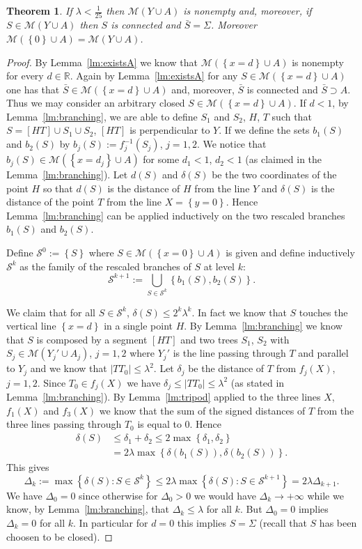 \documentclass{amsart}
\newcommand{\RR}{\mathbb R}
\newcommand{\abs}[1]{\left\vert #1 \right\vert}
\newcommand{\ENCLOSE}[1]{\left\{#1\right\}}
\newcommand{\M}{\mathcal{M}}
\renewcommand{\S}{\mathcal{S}}
\newtheorem{theorem}{Theorem}[section]
\theoremstyle{definition}
\theoremstyle{remark}
\begin{document}
\begin{theorem}\label{th:main}
If $\lambda < \frac 1{25}$ then $\M(Y\cup A)$ is nonempty 
and, moreover, if $S\in \M(Y\cup A)$
then $S$ is connected and $\bar S=\Sigma$.
Moreover $\M(\ENCLOSE{0}\cup A) = \M(Y\cup A)$.
\end{theorem}
%
\begin{proof}
By Lemma~\ref{lm:existsA} we know that $\M(\ENCLOSE{x=d}\cup A)$
is nonempty for every $d\in \RR$.
Again by Lemma~\ref{lm:existsA} for any $S\in \M(\ENCLOSE{x=d}\cup A)$ 
one has that $\bar S\in \M(\ENCLOSE{x=d}\cup A)$ and, moreover,
$\bar S$ is connected and $\bar S\supset A$.
Thus we may consider an arbitrary closed $S\in \M(\ENCLOSE{x=d}\cup A)$.
If $d<1$, 
by Lemma~\ref{lm:branching}, 
we are able to define $S_1$ and $S_2$, $H$, $T$
such that 
$S=[H T] \cup S_1 \cup S_2$, $[HT]$ is perpendicular to $Y$.
If we define the sets $b_1(S)$ and $b_2(S)$ 
by $b_j(S) := f_j^{-1}(S_j)$, $j=1,2$.
We notice that $b_j(S)\in \M(\ENCLOSE{x=d_j}\cup A)$ for some $d_1<1$, 
$d_2<1$ (as claimed in the Lemma~\ref{lm:branching}).
Let $d(S)$ and $\delta(S)$ be the two coordinates of the point $H$ 
so that $d(S)$ is the distance of $H$ from the line $Y$ 
and $\delta(S)$ is the distance of the point $T$ from the line $X=\ENCLOSE{y=0}$.
Hence Lemma~\ref{lm:branching} can be applied inductively on the two 
rescaled branches $b_1(S)$ and $b_2(S)$.

Define $\S^0:=\ENCLOSE{S}$ where $S\in \M(\ENCLOSE{x=0}\cup A)$ is given
and define inductively $\S^k$ as the family of the rescaled branches of $S$ 
at level $k$:
\[
  \S^{k+1} := \bigcup_{S\in \S^k}\ENCLOSE{b_1(S),b_2(S)}.
\]

We claim that for all $S\in \S^k$, $\delta(S)\le 2^k \lambda^k$.
In fact we know that $S$ touches the vertical line $\ENCLOSE{x=d}$ 
in a single point $H$.
By Lemma~\ref{lm:branching} we know that $S$ is composed 
by a segment $[H T]$ and two trees $S_1$, $S_2$
with $S_j\in \M(Y_j'\cup A_j)$, $j=1,2$
where $Y_j'$ is the line passing through $T$ and parallel to $Y_j$
and we know that $\abs{T T_0} \le \lambda^2$. 
Let $\delta_j$ be the distance of $T$ from $f_j(X)$, $j=1,2$.
Since $T_0\in f_j(X)$ we have $\delta_j\le \abs{T T_0} \le \lambda^2$
(as stated in Lemma~\ref{lm:branching}).
By Lemma~\ref{lm:tripod} applied to the three lines $X$, $f_1(X)$ and $f_3(X)$
we know that the sum of the signed distances of $T$ from the three lines 
passing through $T_0$ is equal to $0$.
Hence
\begin{align*}
  \delta(S) &\le \delta_1 + \delta_2 
    \le 2\max\ENCLOSE{\delta_1,\delta_2}\\
    &= 2\lambda\max\ENCLOSE{\delta(b_1(S)),\delta(b_2(S))}.
\end{align*}
This gives 
\[
  \Delta_k 
  := \max\ENCLOSE{\delta(S)\colon S\in \S^k}
   \le 2\lambda \max\ENCLOSE{\delta(S)\colon S\in \S^{k+1}}
   = 2 \lambda \Delta_{k+1}.
\]
We have $\Delta_0 = 0$ since otherwise for 
$\Delta_0>0$ we would have 
$\Delta_k\to +\infty$ while we know,
by Lemma~\ref{lm:branching}, that $\Delta_k \le \lambda$
for all $k$.
But $\Delta_0 =0$ implies $\Delta_k=0$ for all $k$.
In particular for $d=0$ this implies $S=\Sigma$ 
(recall that $S$ has been choosen to be closed).
\end{proof}



\end{document}

